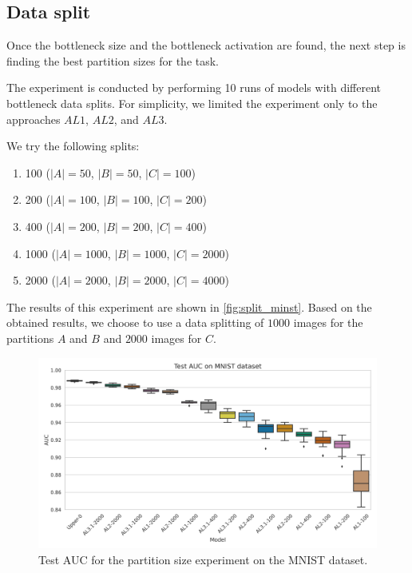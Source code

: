         \subsection{Data split}
            Once the bottleneck size and the bottleneck activation are found, the next step is finding the best partition sizes for the task.
            
            The experiment is conducted by performing 10 runs of models with different bottleneck data splits. For simplicity, we limited the experiment only to the approaches $AL1$, $AL2$, and $AL3$.
            
            We try the following splits:
            \begin{enumerate}
                \item 100 ($|A| = 50$, $ |B| = 50$, $|C| = 100$)
                \item 200 ($|A| = 100$, $ |B| = 100$, $|C| = 200$)
                \item 400 ($|A| = 200$, $ |B| = 200$, $|C| = 400$)
                \item 1000 ($|A| = 1000$, $ |B| = 1000$, $|C| = 2000$)
                \item 2000 ($|A| = 2000$, $ |B| = 2000$, $|C| = 4000$)
            \end{enumerate}
            
            The results of this experiment are shown in \autoref{fig:split_minst}. Based on the obtained results, we choose to use a data splitting of $1000$ images for the partitions $A$ and $B$ and $2000$ images for $C$.
            \begin{figure}[H]
                \centering
                \centerline{\includegraphics[width=\textwidth]{img/results/split_MN.png}}
                \caption{Test AUC for the partition size experiment on the MNIST dataset.}
                \label{fig:split_minst}
            \end{figure}

